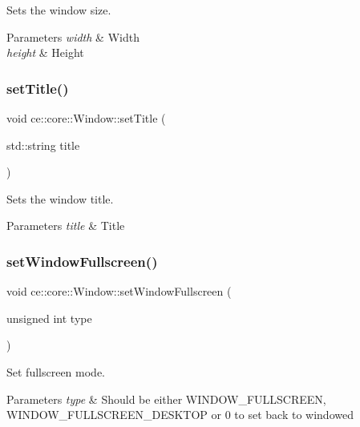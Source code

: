 Sets the window size. 


\begin{DoxyParams}{Parameters}
{\em width} & Width \\
\hline
{\em height} & Height \\
\hline
\end{DoxyParams}
\mbox{\label{classce_1_1core_1_1_window_ac182b4657e4240663b49923e6349e48c}} 
\subsubsection{\texorpdfstring{set\+Title()}{setTitle()}}
{\footnotesize\ttfamily void ce\+::core\+::\+Window\+::set\+Title (\begin{DoxyParamCaption}\item[{std\+::string}]{title }\end{DoxyParamCaption})}



Sets the window title. 


\begin{DoxyParams}{Parameters}
{\em title} & Title \\
\hline
\end{DoxyParams}
\mbox{\label{classce_1_1core_1_1_window_a9fafce9f3898b399c149a561d9ceac12}} 
\subsubsection{\texorpdfstring{set\+Window\+Fullscreen()}{setWindowFullscreen()}}
{\footnotesize\ttfamily void ce\+::core\+::\+Window\+::set\+Window\+Fullscreen (\begin{DoxyParamCaption}\item[{unsigned int}]{type }\end{DoxyParamCaption})}



Set fullscreen mode. 


\begin{DoxyParams}{Parameters}
{\em type} & Should be either W\+I\+N\+D\+O\+W\+\_\+\+F\+U\+L\+L\+S\+C\+R\+E\+EN, W\+I\+N\+D\+O\+W\+\_\+\+F\+U\+L\+L\+S\+C\+R\+E\+E\+N\+\_\+\+D\+E\+S\+K\+T\+OP or 0 to set back to windowed \\
\hline
\end{DoxyParams}
\mbox{\label{classce_1_1core_1_1_window_a40a91b63d87c6942dea3186fb4b05085}} 
